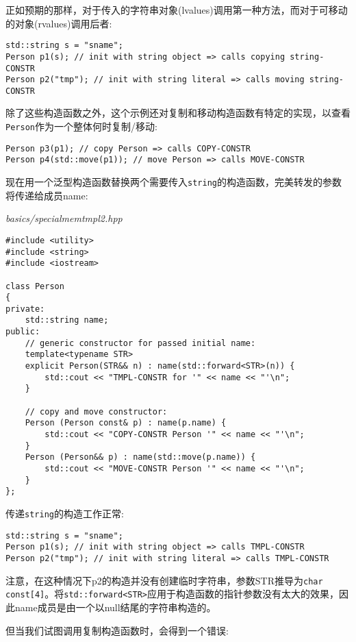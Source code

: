 正如预期的那样，对于传入的字符串对象(lvalues)调用第一种方法，而对于可移动的对象(rvalues)调用后者:

\begin{lstlisting}[style=styleCXX]
std::string s = "sname";
Person p1(s); // init with string object => calls copying string-CONSTR
Person p2("tmp"); // init with string literal => calls moving string-CONSTR
\end{lstlisting}

除了这些构造函数之外，这个示例还对复制和移动构造函数有特定的实现，以查看\texttt{Person}作为一个整体何时复制/移动:

\begin{lstlisting}[style=styleCXX]
Person p3(p1); // copy Person => calls COPY-CONSTR
Person p4(std::move(p1)); // move Person => calls MOVE-CONSTR
\end{lstlisting}

现在用一个泛型构造函数替换两个需要传入\texttt{string}的构造函数，完美转发的参数将传递给成员name:

\noindent
\textit{basics/specialmemtmpl2.hpp}
\begin{lstlisting}[style=styleCXX]
#include <utility>
#include <string>
#include <iostream>

class Person
{
private:
	std::string name;
public:
	// generic constructor for passed initial name:
	template<typename STR>
	explicit Person(STR&& n) : name(std::forward<STR>(n)) {
		std::cout << "TMPL-CONSTR for '" << name << "'\n";
	}

	// copy and move constructor:
	Person (Person const& p) : name(p.name) {
		std::cout << "COPY-CONSTR Person '" << name << "'\n";
	}
	Person (Person&& p) : name(std::move(p.name)) {
		std::cout << "MOVE-CONSTR Person '" << name << "'\n";
	}
};
\end{lstlisting}

传递\texttt{string}的构造工作正常:

\begin{lstlisting}[style=styleCXX]
std::string s = "sname";
Person p1(s); // init with string object => calls TMPL-CONSTR
Person p2("tmp"); // init with string literal => calls TMPL-CONSTR
\end{lstlisting}

注意，在这种情况下p2的构造并没有创建临时字符串，参数STR推导为\texttt{char const[4]}。将\texttt{std::forward<STR>}应用于构造函数的指针参数没有太大的效果，因此name成员是由一个以null结尾的字符串构造的。

但当我们试图调用复制构造函数时，会得到一个错误:

